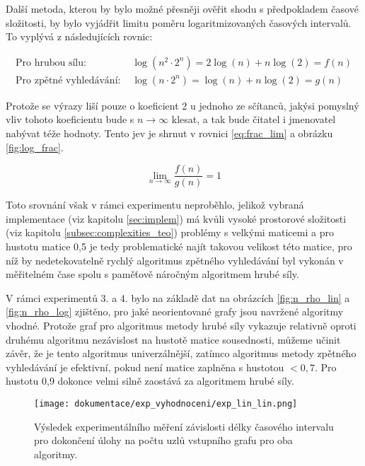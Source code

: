 \documentclass[a4paper]{article}
\begin{document}
        \noindent
        Další metoda, kterou by bylo možné přesněji ověřit shodu s předpokladem časové složitosti, by bylo vyjádřit limitu poměru logaritmizovaných časových intervalů. To vyplývá z následujících rovnic:

        \begin{equation}
            \begin{aligned}
                \text{Pro hrubou sílu: }&\log{\left(n^2\cdot 2^n\right)} = 2\log{\left(n\right)}+n\log{\left(2 \right)} = f(n)\\
                \text{Pro zpětné vyhledávání: }&\log{\left(n\cdot 2^n\right)} = \log{\left(n\right)}+n\log{\left(2 \right)} = g(n)
            \end{aligned}
        \end{equation}

        \noindent
        Protože se výrazy liší pouze o koeficient 2 u jednoho ze sčítanců, jakýsi pomyslný vliv tohoto koeficientu bude s $n \rightarrow \infty$ klesat, a tak bude čitatel i jmenovatel nabývat téže hodnoty. Tento jev je shrnut v rovnici \ref{eq:frac_lim} a obrázku \ref{fig:log_frac}.
        
        \begin{equation} \label{eq:frac_lim}
            \lim_{n\to\infty}\frac{f(n)}{g(n)} = 1
        \end{equation}

        \noindent
        Toto srovnání však v rámci experimentu neproběhlo, jelikož vybraná implementace (viz kapitolu \ref{sec:implem}) má kvůli vysoké prostorové složitosti (viz kapitolu \ref{subsec:complexities_teo}) problémy s velkými maticemi a pro hustotu matice 0,5 je tedy problematické najít takovou velikost této matice, pro níž by nedetekovatelně rychlý algoritmus zpětného vyhledávání byl vykonán v měřitelném čase spolu s paměťově náročným algoritmem hrubé síly.

        \noindent
        V rámci experimentů 3. a 4. bylo na základě dat na obrázcích \ref{fig:n_rho_lin} a \ref{fig:n_rho_log} zjištěno, pro jaké neorientované grafy jsou navržené algoritmy vhodné. Protože graf pro algoritmus metody hrubé síly vykazuje relativně oproti druhému algoritmu nezávislost na hustotě matice sousednosti, můžeme učinit závěr, že je tento algoritmus univerzálnější, zatímco algoritmus metody zpětného vyhledávání je efektivní, pokud není matice zaplněna s hustotou $< 0,7$. Pro hustotu 0,9 dokonce velmi silně zaostává za algoritmem hrubé síly.
    

        \newpage
        \begin{figure}[H]
            \centering
            \texttt{[image: dokumentace/exp\_vyhodnoceni/exp\_lin\_lin.png]}
            \caption{Výsledek experimentálního měření závislosti délky časového intervalu pro dokončení úlohy na počtu uzlů vstupního grafu pro oba algoritmy.}
            \label{fig:exp_n_linlin}
        \end{figure}
\end{document}
